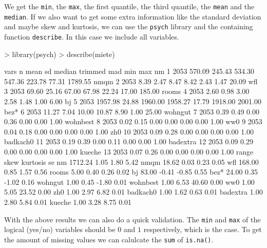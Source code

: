 \documentclass{article}
\begin{document}
We get the \texttt{min}, the \texttt{max}, the first quantile, the third quantile, the \texttt{mean} and the \texttt{median}. If we also want to get some extra information like the standard deviation and maybe skew and kurtosis, we can use the \texttt{psych} library and the containing function \texttt{describe}. In this case we include all variables.

\begin{Schunk}
\begin{Sinput}
> library(psych)
> describe(miete)
\end{Sinput}
\begin{Soutput}
         vars    n    mean     sd  median trimmed    mad     min     max
nm          1 2053  570.09 245.43  534.30  547.36 223.78   77.31 1789.55
nmqm        2 2053    8.39   2.47    8.47    8.42   2.43    1.47   20.09
wfl         3 2053   69.60  25.16   67.00   67.98  22.24   17.00  185.00
rooms       4 2053    2.60   0.98    3.00    2.58   1.48    1.00    6.00
bj          5 2053 1957.98  24.88 1960.00 1958.27  17.79 1918.00 2001.00
bez*        6 2053   11.27   7.04   10.00   10.87   8.90    1.00   25.00
wohngut     7 2053    0.39   0.49    0.00    0.36   0.00    0.00    1.00
wohnbest    8 2053    0.02   0.15    0.00    0.00   0.00    0.00    1.00
ww0         9 2053    0.04   0.18    0.00    0.00   0.00    0.00    1.00
zh0        10 2053    0.09   0.28    0.00    0.00   0.00    0.00    1.00
badkach0   11 2053    0.19   0.39    0.00    0.11   0.00    0.00    1.00
badextra   12 2053    0.09   0.29    0.00    0.00   0.00    0.00    1.00
kueche     13 2053    0.07   0.26    0.00    0.00   0.00    0.00    1.00
           range  skew kurtosis   se
nm       1712.24  1.05     1.80 5.42
nmqm       18.62  0.03     0.23 0.05
wfl       168.00  0.85     1.57 0.56
rooms       5.00  0.40     0.26 0.02
bj         83.00 -0.41    -0.85 0.55
bez*       24.00  0.35    -1.02 0.16
wohngut     1.00  0.45    -1.80 0.01
wohnbest    1.00  6.53    40.60 0.00
ww0         1.00  5.05    23.52 0.00
zh0         1.00  2.97     6.82 0.01
badkach0    1.00  1.62     0.63 0.01
badextra    1.00  2.80     5.84 0.01
kueche      1.00  3.28     8.75 0.01
\end{Soutput}
\end{Schunk}

With the above results we can also do a quick validation. The \texttt{min} and \texttt{max} of the logical (yes/no) variables should be $0$ and $1$ respectively, which is the case. To get the amount of missing values we can calulcate the \texttt{sum} of \texttt{is.na()}.
\end{document}
